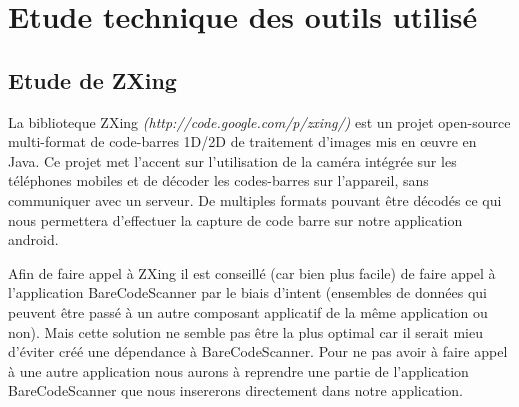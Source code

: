 \section{Etude technique des outils utilisé}

\subsection{Etude de ZXing}
La biblioteque ZXing \textit{(http://code.google.com/p/zxing/)} est un projet open-source multi-format de code-barres 1D/2D de traitement d'images mis en œuvre en Java. Ce projet met l'accent sur l'utilisation de la caméra intégrée sur les téléphones mobiles et de décoder les codes-barres sur l'appareil, sans communiquer avec un serveur.
De multiples formats pouvant être décodés ce qui nous permettera d'effectuer la capture de code barre sur notre application android.

Afin de faire appel à ZXing il est conseillé (car bien plus facile) de faire appel à l'application BareCodeScanner par le biais d'intent (ensembles de données qui peuvent être passé à un autre composant applicatif de la même application ou non). 
Mais cette solution ne semble pas être la plus optimal car il serait mieu d'éviter créé une dépendance à BareCodeScanner.
Pour ne pas avoir à faire appel à une autre application nous aurons à reprendre une partie de l'application BareCodeScanner que nous insererons directement dans notre application. 

